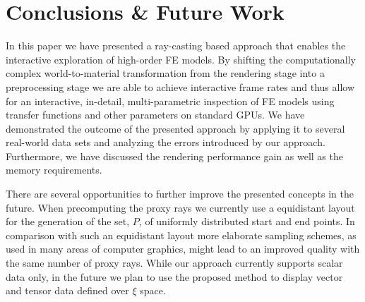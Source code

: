 \documentclass[journal]{vgtc}                %
\begin{document}
\section{Conclusions \& Future Work}\label{sec:conclusions}
In this paper we have presented a ray-casting based approach that enables the interactive exploration of high-order FE models. By shifting the computationally complex world-to-material transformation from the rendering stage into a preprocessing stage we are able to achieve interactive frame rates and thus allow for an interactive, in-detail, multi-parametric inspection of FE models using transfer functions and other parameters on standard GPUs. We have demonstrated the outcome of the presented approach by applying it to several real-world data sets and analyzing the errors introduced by our approach. Furthermore, we have discussed the rendering performance gain as well as the memory requirements.

There are several opportunities to further improve the presented concepts in the future. When precomputing the proxy rays we currently use a equidistant layout for the generation of the set, $P$, of uniformly distributed start and end points. In comparison with such an equidistant layout more elaborate sampling schemes, as used in many areas of computer graphics, might lead to an improved quality with the same number of proxy rays. While our approach currently supports scalar data only, in the future we plan to use the proposed method to display vector and tensor data defined over $\xi$ space.
%
%
%



\end{document}
